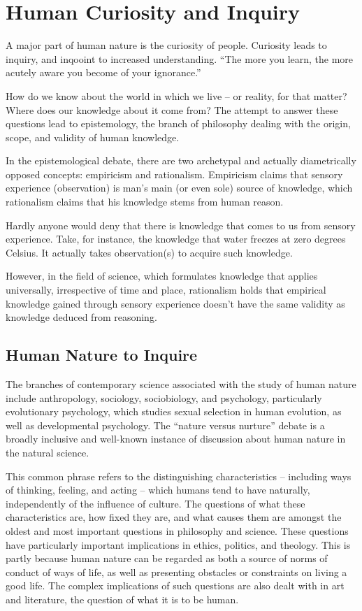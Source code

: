 \section{Human Curiosity and Inquiry}

A major part of human nature is the curiosity of people. Curiosity leads to inquiry, and inqooint to increased understanding. “The more you learn, the more acutely aware you become of your ignorance.”

How do we know about the world in which we live – or reality, for that matter?  Where does our knowledge about it come from?  The attempt to answer these questions lead to epistemology, the branch of philosophy dealing with the origin, scope, and validity of human knowledge.

In the epistemological debate, there are two archetypal and actually diametrically opposed concepts: empiricism and rationalism. Empiricism claims that sensory experience (observation) is man’s main (or even sole) source of knowledge, which rationalism claims that his knowledge stems from human reason.

Hardly anyone would deny that there is knowledge that comes to us from sensory experience. Take, for instance, the knowledge that water freezes at zero degrees Celsius. It actually takes observation(s) to acquire such knowledge.

However, in the field of science, which formulates knowledge that applies universally, irrespective of time and place, rationalism holds that empirical knowledge gained through sensory experience doesn’t have the same validity as knowledge deduced from reasoning.
    
\subsection{Human Nature to Inquire}

The branches of contemporary science associated with the study of human nature include anthropology, sociology, sociobiology, and psychology, particularly evolutionary psychology, which studies sexual selection in human evolution, as well as developmental psychology. The ``nature versus nurture'' debate is a broadly inclusive and well-known instance of discussion about human nature in the natural science.

This common phrase refers to the distinguishing characteristics – including ways of thinking, feeling, and acting – which humans tend to have naturally, independently of the influence of culture. The questions of what these characteristics are, how fixed they are, and what causes them are amongst the oldest and most important questions in philosophy and science. These questions have particularly important implications in ethics, politics, and theology. This is partly because human nature can be regarded as both a source of norms of conduct of ways of life, as well as presenting obstacles or constraints on living a good life. The complex implications of such questions are also dealt with in art and literature, the question of what it is to be human.

